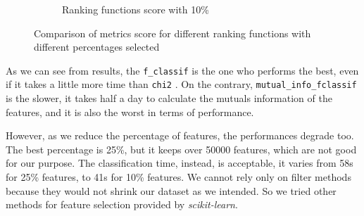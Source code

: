 \begin{figure}[]
\begin{subfigure}[t]{0.48\textwidth}
		\caption{Ranking functions score with 10\%}\label{fig:ranking10}
	\end{subfigure}
	\caption{Comparison of metrics score for different ranking functions with different percentages selected}\label{fig:ranking}
\end{figure}

As we can see from results, the \texttt{f\_classif} is the one who performs the best, even if it takes a little more time than \texttt{chi2} . On the contrary, \texttt{mutual\_info\_fclassif} is the slower, it takes half a day to calculate the mutuals information of the features, and it is also the worst in terms of performance.

However, as we reduce the percentage of features, the performances degrade too. The best percentage is 25\%, but it keeps over 50000 features, which are not good for our purpose. The classification time, instead, is acceptable, it varies from 58s for 25\% features, to 41s for 10\% features. 
We cannot rely only on filter methods because they would not shrink our dataset as we intended. So we tried other methods for feature selection provided by \textit{scikit-learn}.




